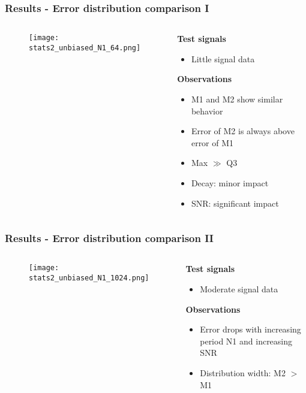 \documentclass[11pt,aspectratio=169]{beamer}
\begin{document}
	\begin{frame}
		\frametitle{Results - Error distribution comparison I}
		\begin{columns}[t]
			\begin{RIPcolleft}
				\begin{figure}
					\texttt{[image: stats2\_unbiased\_N1\_64.png]}
				\end{figure}
			\end{RIPcolleft}
			\begin{RIPcolright}
				\textbf{Test signals}\\
				\begin{itemize}
					\item Little signal data
				\end{itemize}
				\textbf{Observations}\\
				\begin{itemize}
					\item M1 and M2 show similar behavior
					\item Error of M2 is always above error of M1
					\item Max $\gg$ Q3
					\item Decay: minor impact
					\item SNR: significant impact
				\end{itemize}
			\end{RIPcolright}
		\end{columns}
	\end{frame}
	\begin{frame}
		\frametitle{Results - Error distribution comparison II}
		\begin{columns}[t]
			\begin{RIPcolleft}
				\begin{figure}
					\texttt{[image: stats2\_unbiased\_N1\_1024.png]}
				\end{figure}
			\end{RIPcolleft}
			\begin{RIPcolright}
				\textbf{Test signals}\\
				\begin{itemize}
					\item Moderate signal data
				\end{itemize}
				\textbf{Observations}\\
				\begin{itemize}
					\item Error drops with increasing period N1 and increasing SNR
					\item Distribution width: \hfill{} M2 $>$ M1
				\end{itemize}
			\end{RIPcolright}
		\end{columns}
	\end{frame}
\end{document}
